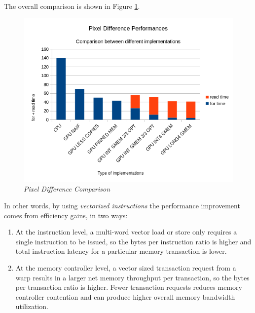 \documentclass[paper=a4, fontsize=10pt]{scrartcl}	%
\begin{document}
	The overall comparison is shown in Figure \ref{fig:chart6}.

	\begin{figure}[H]
		\centering
		\includegraphics[width=0.9\linewidth]{images/chart6.png}
		\caption{\textit{Pixel Difference Comparison}}
		\label{fig:chart6}
	\end{figure}

	In other words, by using \textit{vectorized instructions} the performance improvement comes from efficiency gains, in two ways:

	\begin{enumerate}
		\item At the instruction level, a multi-word vector load or store only requires a single instruction to be issued, so the bytes per instruction ratio is higher and total instruction latency for a particular memory transaction is lower.
		\item At the memory controller level, a vector sized transaction request from a warp results in a larger net memory throughput per transaction, so the bytes per transaction ratio is higher. Fewer transaction requests reduces memory controller contention and can produce higher overall memory bandwidth utilization.
	\end{enumerate}

	
\end{document}
